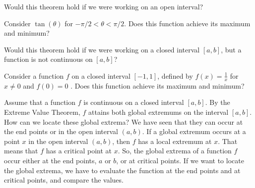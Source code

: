 \documentclass{ximera}
\begin{document}
\begin{question}
  Would this theorem hold if we were working on an open interval?
  \begin{multipleChoice}
  \end{multipleChoice}
  \begin{hint}
    Consider $\tan(\theta)$ for $-\pi/2 < \theta < \pi/2$. Does this function achieve its maximum and minimum? 
  \end{hint}
\end{question}
\begin{question}
  Would this theorem hold if we were working on a closed interval $[a,b]$, but a function is not continuous on $[a,b]$?
  \begin{multipleChoice}
  \end{multipleChoice}
  \begin{hint}
    Consider a function $f$   on a closed interval $[-1,1]$, defined by  $f(x)=\frac{1}{x}$ for $x\neq 0$ and $f(0)=0$ . Does this function achieve its maximum and minimum? 
  \end{hint}
\end{question}
Assume that a function $f$ is continuous on a closed interval $[a,b]$. By the Extreme Value Theorem, $f$ attains both global extremums on the interval $[a,b]$.
How can we locate these global extrema? We have seen that they can occur at the end points or in the open interval $(a,b)$.
If a global extremum occurs at a point $x$ in the open interval $(a,b)$, then $f$ has a local extremum at $x$. That means that $f$ has  a critical point at $x$.
So, the global extrema of a function  $f$ occur either at the end points, $a$ or $b$, or at critical points. If we want to locate the global extrema, we have to evaluate the function at the end points and at critical points, and compare the values. 
\end{document}
